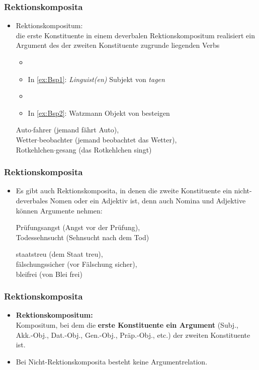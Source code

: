 \begin{frame}
\frametitle{Rektionskomposita}

\begin{itemize}
	\item Rektionskompositum: \\
	die erste Konstituente in einem deverbalen Rektionskompositum realisiert ein Argument des der zweiten Konstituente zugrunde liegenden Verbs
	
	\begin{itemize}
		\item[]
		\item In \ref{ex:Bsp1}: \emph{Linguist(en)} \ras Subjekt von \emph{tagen}
		\item[]
		\item In \ref{ex:Bsp2}: Watzmann \ras Objekt von besteigen
	\end{itemize}
	
	\ea	 Auto$\cdot$fahrer (jemand fährt Auto), \\
		 Wetter$\cdot$beobachter (jemand beobachtet das Wetter), \\
		 Rotkehlchen$\cdot$gesang (das Rotkehlchen singt)
	\z
		 
\end{itemize}


\end{frame}


\begin{frame}
\frametitle{Rektionskomposita}

\begin{itemize}
	\item Es gibt auch Rektionskomposita, in denen die zweite Konstituente ein nicht-deverbales Nomen oder ein Adjektiv ist, denn auch Nomina und Adjektive können Argumente nehmen:
	
	\ea Prüfungsangst (Angst vor der Prüfung), \\
		 Todessehnsucht (Sehnsucht nach dem Tod)
	\z
		 
	\ea staatstreu (dem Staat treu), \\
		 fälschungssicher (vor Fälschung sicher), \\
		 bleifrei (von Blei frei)
	\z
		 
\end{itemize}


\end{frame}


\begin{frame}
\frametitle{Rektionskomposita}

\begin{itemize}
	\item \textbf{Rektionskompositum:} \\
	Kompositum, bei dem die \textbf{erste Konstituente ein Argument} (Subj., Akk.-Obj., Dat.-Obj., Gen.-Obj., Präp.-Obj., etc.) der zweiten Konstituente ist.
	\item Bei Nicht-Rektionskomposita besteht keine Argumentrelation.
\end{itemize}


\end{frame}


